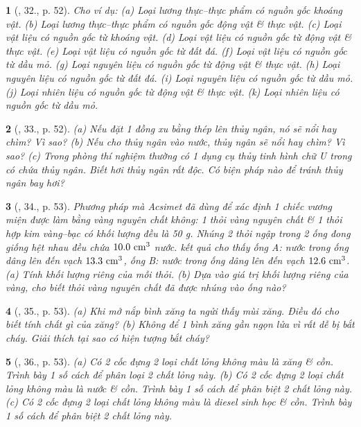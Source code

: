 \documentclass{article}
\newtheorem{baitoan}{}
\begin{document}
\begin{baitoan}[\cite{ncpt_KHTN_6_tap_1}, 32., p. 52]
	Cho ví dụ: (a) Loại lương thực--thực phẩm có nguồn gốc khoáng vật. (b) Loại lương thực--thực phẩm có nguồn gốc động vật \& thực vật. (c) Loại vật liệu có nguồn gốc từ khoáng vật. (d) Loại vật liệu có nguồn gốc từ động vật \& thực vật. (e) Loại vật liệu có nguồn gốc từ đất đá. (f) Loại vật liệu có nguồn gốc từ dầu mỏ. (g) Loại nguyên liệu có nguồn gốc từ động vật \& thực vật. (h) Loại nguyên liệu có nguồn gốc từ đất đá. (i) Loại nguyên liệu có nguồn gốc từ dầu mỏ. (j) Loại nhiên liệu có nguồn gốc từ động vật \& thực vật. (k) Loại nhiên liệu có nguồn gốc từ dầu mỏ.
\end{baitoan}

\begin{baitoan}[\cite{ncpt_KHTN_6_tap_1}, 33., p. 52]
	(a) Nếu đặt 1 đồng xu bằng thép lên thủy ngân, nó sẽ nổi hay chìm? Vì sao? (b) Nếu cho thủy ngân vào nước, thủy ngân sẽ nổi hay chìm? Vì sao? (c) Trong phòng thí nghiệm thường có 1 dụng cụ thủy tinh hình chữ U trong có chứa thủy ngân. Biết hơi thủy ngân rất độc. Có biện pháp nào để tránh thủy ngân bay hơi?
\end{baitoan}

\begin{baitoan}[\cite{ncpt_KHTN_6_tap_1}, 34., p. 53]
	Phương pháp mà Acsimet đã dùng để xác định 1 chiếc vương miện được làm bằng vàng nguyên chất không: 1 thỏi vàng nguyên chất \& 1 thỏi hợp kim vàng--bạc có khối lượng đều là {\rm50 g}. Nhúng 2 thỏi ngập trong 2 ống đong giống hệt nhau đều chứa $\rm10.0\ cm^3$ nước. kết quả cho thấy ống A: nước trong ống dâng lên đến vạch $\rm13.3\ cm^3$, ống B: nước trong ống dâng lên đến vạch $\rm12.6\ cm^3$. (a) Tính khối lượng riêng của mỗi thỏi. (b) Dựa vào giá trị khối lượng riêng của vàng, cho biết thỏi vàng nguyên chất đã được nhúng vào ống nào? 
\end{baitoan}

\begin{baitoan}[\cite{ncpt_KHTN_6_tap_1}, 35., p. 53]
	(a) Khi mở nắp bình xăng ta ngửi thấy mùi xăng. Điều đó cho biết tính chất gì của xăng? (b) Không để 1 bình xăng gần ngọn lửa vì rất dễ bị bắt cháy. Giải thích tại sao có hiện tượng bắt cháy?
\end{baitoan}

\begin{baitoan}[\cite{ncpt_KHTN_6_tap_1}, 36., p. 53]
	(a) Có 2 cốc đựng 2 loại chất lỏng không màu là xăng \& cồn. Trình bày 1 số cách để phân loại 2 chất lỏng này. (b) Có 2 cốc đựng 2 loại chất lỏng không màu là nước \& cồn. Trình bày 1 số cách để phân biệt 2 chất lỏng này. (c) Có 2 cốc đựng 2 loại chất lỏng không màu là diesel sinh học \& cồn. Trình bày 1 số cách để phân biệt 2 chất lỏng này.
\end{baitoan}
\end{document}
